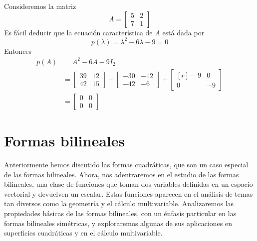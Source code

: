 \begin{example}
    Consideremos la matriz
    $$A = \begin{bmatrix}
        5 & 2 \\
        7 & 1
    \end{bmatrix}$$
    Es fácil deducir que la ecuación característica de $A$ está dada por
    $$p(\lambda) = \lambda^2 - 6\lambda - 9 = 0$$
    Entonces
    \begin{align*}
        p(A) & = A^2 - 6A - 9I_2 \\
        & = \begin{bmatrix}
            39 & 12 \\
            42 & 15
        \end{bmatrix} + \begin{bmatrix}
            -30 & -12 \\
            -42 & -6
        \end{bmatrix} + \begin{bmatrix*}[r]
            -9 & 0 \\
            0 & -9
        \end{bmatrix*} \\
        & = \begin{bmatrix}
            0 & 0 \\
            0 & 0
        \end{bmatrix}
    \end{align*}
\end{example}

\section{Formas bilineales}

Anteriormente hemos discutido las formas cuadráticas, que son un caso especial de las formas bilineales. Ahora, nos adentraremos en el estudio de las formas bilineales, una clase de funciones que toman dos variables definidas en un espacio vectorial y devuelven un escalar. Estas funciones aparecen en el análisis de temas tan diversos como la geometría y el cálculo multivariable. Analizaremos las propiedades básicas de las formas bilineales, con un énfasis particular en las formas bilineales simétricas, y exploraremos algunas de sus aplicaciones en superficies cuadráticas y en el cálculo multivariable.

